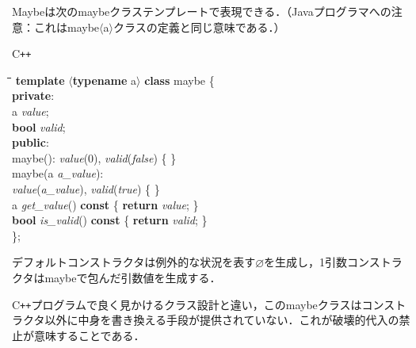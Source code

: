 \documentclass[twocolumn]{jsbook}
\newcommand{\cxx}{\textrm{C}\texttt{++}}
\newenvironment{cxxcode}{\begin{itembox}[r]{\cxx}}{\end{itembox}}
\newenvironment{python}{\begin{tabbing}\hspace*{1em}\=\hspace*{1em}\=\hspace*{1em}\=\hspace*{1em}\=\kill}{\end{tabbing}}
\newcommand{\pthnClassname}[1]{\textrm{#1}}
\newcommand{\pthnId}[1]{\textit{#1}}
\newcommand{\pthnKeyword}[1]{\textbf{#1}}
\newcommand{\hsklNothing}{\varnothing}
\begin{document}
Maybeは次の\pthnClassname{maybe}クラステンプレートで表現できる．（Javaプログラマへの注意：これは\pthnClassname{maybe}$\langle$\pthnClassname{a}$\rangle$クラスの定義と同じ意味である．）
\begin{cxxcode}
\begin{python}
\pthnKeyword{template} $\langle$\pthnKeyword{typename} \pthnClassname{a}$\rangle$ \pthnKeyword{class} \pthnClassname{maybe} \{\\
\pthnKeyword{private}:\\
\>\pthnClassname{a} \pthnId{value};\\
\>\pthnKeyword{bool} \pthnId{valid};\\
\pthnKeyword{public}:\\
\>\pthnClassname{maybe}(): \pthnId{value}($0$), \pthnId{valid}(\pthnId{false}) \{ \}\\
\>\pthnClassname{maybe}(\pthnClassname{a} \pthnId{a\_value}):\\
\>\>\pthnId{value}(\pthnId{a\_value}), \pthnId{valid}(\pthnId{true}) \{ \}\\
\>\pthnClassname{a} \pthnId{get\_value}() \pthnKeyword{const} \{ \pthnKeyword{return} \pthnId{value}; \}\\
\>\pthnKeyword{bool} \pthnId{is\_valid}() \pthnKeyword{const} \{ \pthnKeyword{return} \pthnId{valid}; \}\\
\};
\end{python}
\end{cxxcode}
デフォルトコンストラクタは例外的な状況を表す$\hsklNothing$を生成し，1引数コンストラクタは\pthnClassname{maybe}で包んだ引数値を生成する．

\cxx プログラムで良く見かけるクラス設計と違い，この\pthnClassname{maybe}クラスはコンストラクタ以外に中身を書き換える手段が提供されていない．これが破壊的代入の禁止が意味することである．
\end{document}
